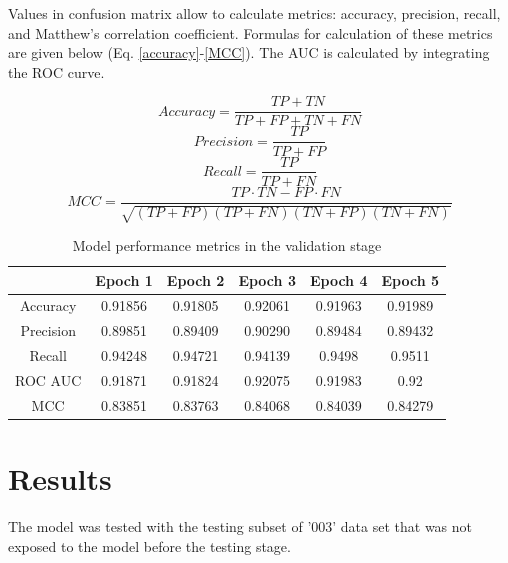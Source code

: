 \documentclass[12pt]{article}
\begin{document}
	Values in confusion matrix allow to calculate metrics: accuracy, precision, 
	recall, and Matthew's correlation coefficient. Formulas for calculation of these metrics are given below 
	(Eq. \ref{accuracy}-\ref{MCC}).
	The AUC is calculated by integrating the ROC curve. 

	\begin{equation}
		Accuracy = \frac{TP+TN}{TP+FP+TN+FN} 
		\label{accuracy}
	\end{equation}
	\begin{equation}
		Precision = \frac{TP}{TP+FP} 
		\label{precision}
	\end{equation}
	\begin{equation}
		Recall = \frac{TP}{TP+FN} 
		\label{recall}
	\end{equation}
	\begin{equation}
		\label{MCC}
		MCC = \frac{TP \cdot TN - FP \cdot FN}{\sqrt{(TP+FP)(TP+FN)(TN+FP)(TN+FN)}} 
	\end{equation}

	\begin{table}[h!]
		\caption{Model performance metrics in the validation stage }
		\vspace{0.2cm}
		\centering
		\begin{tabular}{ | c | c c c c c | }
			\hline 
			& Epoch 1 & Epoch 2 & Epoch 3 & Epoch 4 & Epoch 5 \\
			\hline 
			Accuracy & 0.91856 & 0.91805 & 0.92061 & 0.91963 & 0.91989 \\
			Precision & 0.89851 & 0.89409 & 0.90290 & 0.89484 & 0.89432 \\
			Recall & 0.94248 & 0.94721 & 0.94139 & 0.9498 & 0.9511 \\  
			ROC AUC & 0.91871 & 0.91824 & 0.92075 & 0.91983 & 0.92 \\
			MCC & 0.83851 & 0.83763 & 0.84068 & 0.84039 & 0.84279 \\
			\hline 
		\end{tabular}
		\label{table:SLP003metricsValidation4}
	\end{table}

	\pagebreak

	\section{Results}

	The model was tested with the testing subset of '003' data set that was
	not exposed to the model before the testing stage. 
\end{document}
